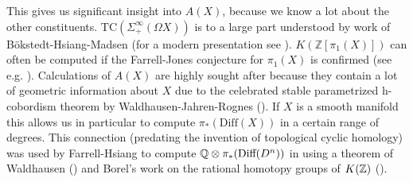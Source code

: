 This gives us significant insight into $A(X)$, because we know a lot about the other constituents.
${\text{TC}(\Sigma^\infty_+(\Omega X))}$ is to a large part understood by work of Bökstedt-Hsiang-Madsen \cite{BHMtrace} (for a modern presentation see \cite[Section~IV.3]{NS}). 
$K(\mathbb{Z}[\pi_1(X)])$ can often be computed if the Farrell-Jones conjecture for $\pi_1(X)$ is confirmed (see e.g. \cite{BartelsLückReich-FJC}). 
Calculations of $A(X)$ are highly sought after because they contain a lot of geometric information about $X$ due to the celebrated stable parametrized h-cobordism theorem by Waldhausen-Jahren-Rognes (\cite{WJR2013spaces}). If $X$ is a smooth manifold this allows us in particular to compute $\pi_*(\mathrm{Diff}(X))$ in a certain range of degrees. This connection (predating the invention of topological cyclic homology) was used by Farrell-Hsiang to compute $\mathbb{Q}\otimes\pi_*(\text{Diff}(D^n))$ in \cite{farrellhsiang1978rational} using a theorem of Waldhausen (\cite[Corollary~2.3.8]{waldhausen1985algebraic}) and Borel's work on the rational homotopy groups of $K(\mathbb{Z})$ (\cite[Chapter~12]{borel1974stable}).
